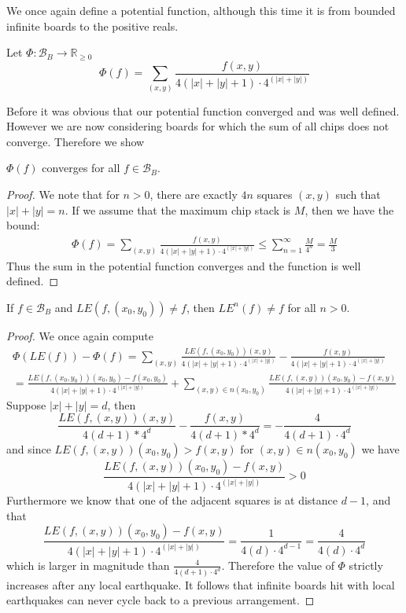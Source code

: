 \documentclass[runningheads,a4paper]{llncs}
\begin{document}
We once again define a potential function, although this time it is from bounded infinite boards to the positive reals. \begin{definition} Let $\Phi: \mathcal{B}_B \rightarrow \mathbb{R}_{\geq 0}$
\[ \Phi(f) = \sum_{(x,y)}\frac{f(x,y)}{4(|x|+|y|+1)\cdot4^{(|x|+|y|)}} \]
\end{definition}
Before it was obvious that our potential function converged and was well defined. However we are now considering boards for which the sum of all chips does not converge. Therefore we show 
\begin{lemma} $\Phi(f)$ converges for all $f \in \mathcal{B}_B$.
\end{lemma}
\begin{proof}
We note that for $n > 0$, there are exactly $4n$ squares $(x,y)$ such that $|x| + |y| = n$. If we assume that the maximum chip stack is $M$, then we have the bound:
\begin{align*}
\Phi(f) = \sum_{(x,y)}\frac{f(x,y)}{4(|x|+|y|+1)\cdot4^{(|x|+|y|)}} \leq \sum_{n=1}^\infty \frac{M}{4^n} = \frac{M}{3}
\end{align*}
Thus the sum in the potential function converges and the function is well defined. 
\end{proof}

\begin{theorem} 
If $f \in \mathcal{B}_B$ and $LE(f, (x_0,y_0)) \neq f$, then $LE^{n}(f) \neq f$ for all $n>0$.
\end{theorem}
\begin{proof}
We once again compute 
\begin{align*}
\Phi(LE(f))-\Phi(f) = \sum_{(x,y)} \frac{LE(f, (x_0,y_0))(x,y)}{4(|x|+|y|+1)\cdot4^{(|x|+|y|)}} - \frac{f(x,y)}{4(|x|+|y|+1)\cdot4^{(|x|+|y|)}} \\
=\frac{LE(f, (x_0,y_0))(x_0,y_0)-f(x_0,y_0)}{4(|x|+|y|+1)\cdot4^{(|x|+|y|)}} + \sum_{(x,y) \in n(x_0,y_0)} \frac{LE(f, (x,y))(x_0,y_0)-f(x,y)}{4(|x|+|y|+1)\cdot4^{(|x|+|y|)}} 
\end{align*}
Suppose $|x|+|y|=d$, then 
\begin{equation*}
\frac{LE(f,(x,y))(x,y)}{4(d+1)*4^d} -\frac{f(x,y)}{4(d+1)*4^d} =-\frac{4}{4(d+1)\cdot 4^d}
\end{equation*}
and since $LE(f, (x,y))(x_0,y_0)>f(x,y)$ for $(x,y) \in n(x_0,y_0)$ we have
\begin{equation*}
\frac{LE(f, (x,y))(x_0,y_0)-f(x,y)}{4(|x|+|y|+1)\cdot4^{(|x|+|y|)}} >0
\end{equation*}
Furthermore we know that one of the adjacent squares is at distance $d-1$, and that 
\begin{equation*}
\frac{LE(f, (x,y))(x_0,y_0)-f(x,y)}{4(|x|+|y|+1)\cdot4^{(|x|+|y|)}}  = \frac{1}{4(d)\cdot 4^{d-1}} = \frac{4}{4(d)\cdot 4^d}
\end{equation*}which is larger in magnitude than $\frac{4}{4(d+1)\cdot 4^d}$. Therefore the value of $\Phi$ strictly increases after any local earthquake.
It follows that infinite boards hit with local earthquakes can never cycle back to a previous arrangement.
\end{proof}
\end{document}

